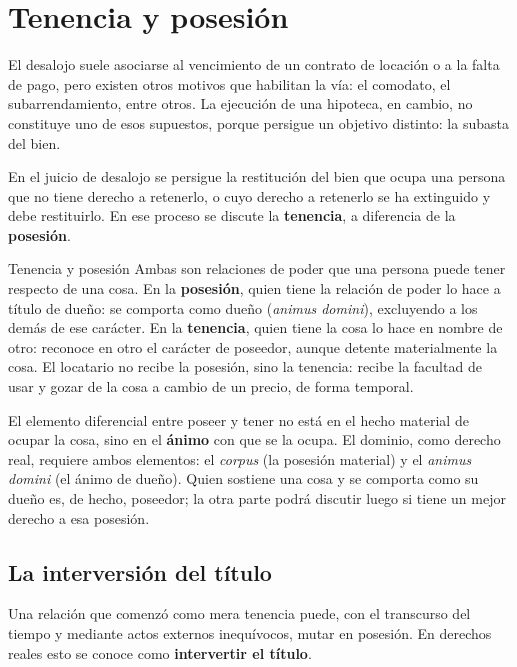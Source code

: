 \documentclass[12pt,oneside]{book}
\begin{document}
\section{Tenencia y posesión}\label{sec:tenencia-posesion}

El desalojo suele asociarse al vencimiento de un contrato de locación o a la falta de pago, pero existen otros motivos que habilitan la vía: el comodato, el subarrendamiento, entre otros. La ejecución de una hipoteca, en cambio, no constituye uno de esos supuestos, porque persigue un objetivo distinto: la subasta del bien.

En el juicio de desalojo se persigue la restitución del bien que ocupa una persona que no tiene derecho a retenerlo, o cuyo derecho a retenerlo se ha extinguido y debe restituirlo. En ese proceso se discute la \textbf{tenencia}, a diferencia de la \textbf{posesión}.

\begin{definition}{Tenencia y posesión}
Ambas son relaciones de poder que una persona puede tener respecto de una cosa. En la \textbf{posesión}, quien tiene la relación de poder lo hace a título de dueño: se comporta como dueño (\textit{animus domini}), excluyendo a los demás de ese carácter. En la \textbf{tenencia}, quien tiene la cosa lo hace en nombre de otro: reconoce en otro el carácter de poseedor, aunque detente materialmente la cosa. El locatario no recibe la posesión, sino la tenencia: recibe la facultad de usar y gozar de la cosa a cambio de un precio, de forma temporal.
\end{definition}

\begin{important}
El elemento diferencial entre poseer y tener no está en el hecho material de ocupar la cosa, sino en el \textbf{ánimo} con que se la ocupa. El dominio, como derecho real, requiere ambos elementos: el \textit{corpus} (la posesión material) y el \textit{animus domini} (el ánimo de dueño). Quien sostiene una cosa y se comporta como su dueño es, de hecho, poseedor; la otra parte podrá discutir luego si tiene un mejor derecho a esa posesión.
\end{important}

\subsection{La interversión del título}

Una relación que comenzó como mera tenencia puede, con el transcurso del tiempo y mediante actos externos inequívocos, mutar en posesión. En derechos reales esto se conoce como \textbf{intervertir el título}.
\end{document}
